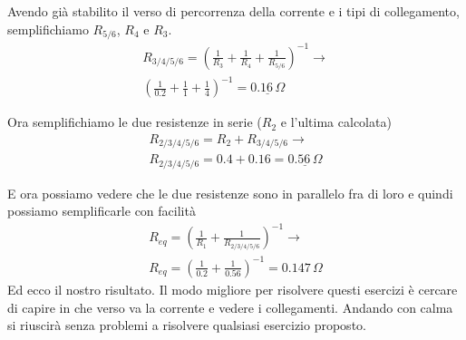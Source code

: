\begin{center}
\end{center}
Avendo già stabilito il verso di percorrenza della corrente e i tipi di collegamento, semplifichiamo
$R_{5/6}$, $R_4$ e $R_3$.
\begin{align*}
  R_{3/4/5/6} = \left(\frac{1}{R_3} + \frac{1}{R_4} + \frac{1}{R_{5/6}}\right)^{-1} \rightarrow\\
  \left(\frac{1}{0.2} + \frac{1}{1} + \frac{1}{4}\right)^{-1} = \underline{0.16\,\Omega}
\end{align*}

\begin{center}
\end{center}
Ora semplifichiamo le due resistenze in serie ($R_2$ e l'ultima calcolata)
\begin{align*}
  R_{2/3/4/5/6} = R_2 + R_{3/4/5/6} \rightarrow \\
  R_{2/3/4/5/6} = 0.4 + 0.16 = \underline{ 0.56\,\Omega}
\end{align*}

\begin{center}
\end{center}
E ora possiamo vedere che le due resistenze sono in parallelo fra di loro e quindi possiamo
semplificarle con facilità
\begin{align*}
  R_{eq} = \left(\frac{1}{R_1} + \frac{1}{R_{2/3/4/5/6}}\right)^{-1} \rightarrow\\
  R_{eq} = \left(\frac{1}{0.2} + \frac{1}{0.56}\right)^{-1} = \boxed{0.147\,\Omega}
\end{align*}
Ed ecco il nostro risultato. Il modo migliore per risolvere questi esercizi è cercare di capire
in che verso va la corrente e vedere i collegamenti. Andando con calma si riuscirà senza problemi a 
risolvere qualsiasi esercizio proposto.

